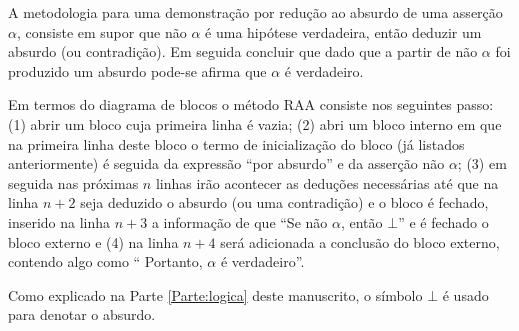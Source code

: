
\begin{definition}
	A metodologia para uma demonstração por redução ao absurdo de uma asserção $\alpha$, consiste em supor que não $\alpha$ é uma hipótese verdadeira, então deduzir um absurdo (ou contradição). Em seguida concluir que dado que a partir de não $\alpha$ foi produzido um absurdo pode-se afirma que $\alpha$ é verdadeiro.
\end{definition} 

Em termos do diagrama de blocos o método RAA consiste nos seguintes passo: (1) abrir um bloco  cuja primeira linha é vazia; (2) abri um bloco interno em que na primeira linha deste bloco o termo de inicialização do bloco (já listados anteriormente) é seguida da expressão ``por absurdo'' e da asserção não $\alpha$; (3) em seguida nas próximas $n$ linhas irão acontecer as deduções necessárias até que na linha $n+2$ seja deduzido o absurdo (ou uma contradição) e o bloco é fechado, inserido na linha $n +3$ a informação de que ``Se não $\alpha$, então $\bot$'' e é fechado o bloco externo e (4) na linha $n + 4$ será adicionada a conclusão do bloco externo, contendo algo como `` Portanto, $\alpha$ é verdadeiro''.

\begin{remark}
	Como explicado na Parte \ref{Parte:logica} deste manuscrito, o símbolo $\bot$ é usado para denotar o absurdo.
\end{remark}

